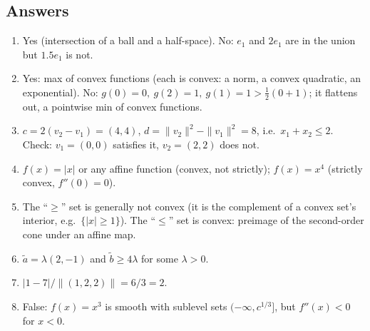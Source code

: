 \documentclass[11pt]{article}
\newcommand{\lam}{\lambda}
\theoremstyle{definition}
\theoremstyle{plain}
\theoremstyle{remark}
\begin{document}
\subsection*{Answers}
\begin{enumerate}
\item Yes (intersection of a ball and a half-space). No: $e_1$ and $2e_1$ are in the union but $1.5e_1$ is not.
\item Yes: max of convex functions (each is convex: a norm, a convex quadratic, an exponential). No: $g(0)=0,\ g(2)=1,\ g(1)=1>\tfrac12(0+1)$; it flattens out, a pointwise min of convex functions.
\item $c=2(v_2-v_1)=(4,4)$, $d=\|v_2\|^2-\|v_1\|^2=8$, i.e.\ $x_1+x_2\le2$. Check: $v_1=(0,0)$ satisfies it, $v_2=(2,2)$ does not.
\item $f(x)=|x|$ or any affine function (convex, not strictly); $f(x)=x^4$ (strictly convex, $f''(0)=0$).
\item The ``$\ge$'' set is generally not convex (it is the complement of a convex set's interior, e.g.\ $\{|x|\ge1\}$). The ``$\le$'' set is convex: preimage of the second-order cone under an affine map.
\item $\tilde a=\lam(2,-1)$ and $\tilde b\ge4\lam$ for some $\lam>0$.
\item $|1-7|/\|(1,2,2)\|=6/3=2$.
\item False: $f(x)=x^3$ is smooth with sublevel sets $(-\infty,c^{1/3}]$, but $f''(x)<0$ for $x<0$.
\end{enumerate}
\end{document}
